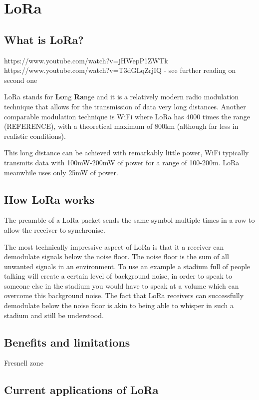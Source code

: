 \section{LoRa}

\subsection{What is LoRa?}

https://www.youtube.com/watch?v=jHWepP1ZWTk
https://www.youtube.com/watch?v=T3dGLqZrjIQ
- see further reading on second one

LoRa stands for \textbf{Lo}ng \textbf{Ra}nge and it is a relatively modern radio
modulation technique that allows for the transmission of data very long
distances. Another comparable modulation technique is WiFi where LoRa has 4000
times the range (REFERENCE), with a theoretical maximum of 800km (although far
less in realistic conditions). 

This long distance can be achieved with remarkably little power, WiFi typically
transmits data with 100mW-200mW of power for a range of 100-200m. LoRa meanwhile
uses only 25mW of power.

\subsection{How LoRa works}

The preamble of a LoRa packet sends the same symbol multiple times in a row to
allow the receiver to synchronise.

The most technically impressive aspect of LoRa is that it a receiver can
demodulate signals below the noise floor. The noise floor is the sum of all
unwanted signals in an environment. To use an example a stadium full of people
talking will create a certain level of background noise, in order to speak to
someone else in the stadium you would have to speak at a volume which can
overcome this background noise. The fact that LoRa receivers can successfully
demodulate below the noise floor is akin to being able to whisper in such a
stadium and still be understood.

\subsection{Benefits and limitations}

Fresnell zone


\subsection{Current applications of LoRa}